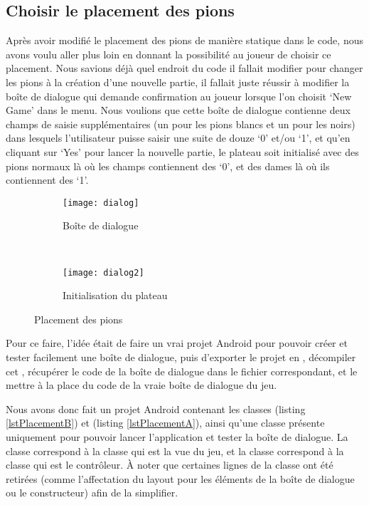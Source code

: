 
\subsection{Choisir le placement des pions}

Après avoir modifié le placement des pions de manière statique dans le code, nous avons voulu aller plus loin en donnant la possibilité au joueur de choisir ce placement. Nous savions déjà quel endroit du code il fallait modifier pour changer les pions à la création d'une nouvelle partie, il fallait juste réussir à modifier la boîte de dialogue qui demande confirmation au joueur lorsque l'on choisit `New Game' dans le menu. Nous voulions que cette boîte de dialogue contienne deux champs de saisie supplémentaires (un pour les pions blancs et un pour les noirs) dans lesquels l'utilisateur puisse saisir une suite de douze `0' et/ou `1', et qu'en cliquant sur `Yes' pour lancer la nouvelle partie, le plateau soit initialisé avec des pions normaux là où les champs contiennent des `0', et des dames là où ils contiennent des `1'.\\

\begin{figure}[h]
\centering
\begin{subfigure}{.4\textwidth}
\centering
\texttt{[image: dialog]}
\label{fig:dialogBoite}
\caption{Boîte de dialogue}
\end{subfigure}~
\begin{subfigure}{.4\textwidth}
\centering
\texttt{[image: dialog2]}
\label{fig:dialogPlacement}
\caption{Initialisation du plateau}
\end{subfigure}
\label{fig:dialog}
\caption{Placement des pions}
\end{figure}

Pour ce faire, l'idée était de faire un vrai projet Android pour pouvoir créer et tester facilement une boîte de dialogue, puis d'exporter le projet en , décompiler cet , récupérer le code de la boîte de dialogue dans le fichier  correspondant, et le mettre à la place du code de la vraie boîte de dialogue du jeu.

Nous avons donc fait un projet Android contenant les classes  (listing \ref{lstPlacementB}) et  (listing \ref{lstPlacementA}), ainsi qu'une classe  présente uniquement pour pouvoir lancer l'application et tester la boîte de dialogue. La classe  correspond à la classe  qui est la vue du jeu, et la classe  correspond à la classe  qui est le contrôleur. \`{A} noter que certaines lignes de la classe  ont été retirées (comme l'affectation du layout pour les éléments de la boîte de dialogue ou le constructeur) afin de la simplifier.\\


